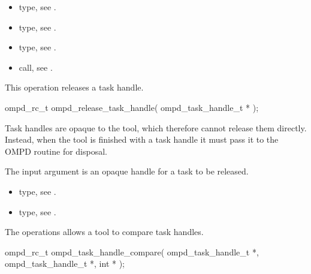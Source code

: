 \crossreferences
\begin{itemize}
	\item {} type, see .
	\item {} type, see 
	.
	\item {} type, see .
	\item {} call, see 
	.
\end{itemize}

\label{subsubsubsec:ompd_release_task_handle}
\summary
This operation releases a task handle.

\format

\begin{cspecific}
\begin{ompSyntax}
ompd_rc_t ompd_release_task_handle(
  ompd_task_handle_t *
);
\end{ompSyntax}
\end{cspecific}


\descr
Task handles are opaque to the tool, which therefore cannot release
them directly. Instead, when the tool is finished with a task handle it must
pass it to the OMPD  routine
for disposal.

\argdesc
The input argument  is an opaque handle for a task
to be released.

\crossreferences
\begin{itemize}
  \item {} type, see .
	\item {} type, see .
\end{itemize}


\label{subsubsubsec:ompd_task_handle_compare}
\summary
The  operations allows a tool to compare task
handles.

\format

\begin{cspecific}
\begin{ompSyntax}
ompd_rc_t ompd_task_handle_compare(
  ompd_task_handle_t *,
  ompd_task_handle_t *,
  int *
);
\end{ompSyntax}
\end{cspecific}



